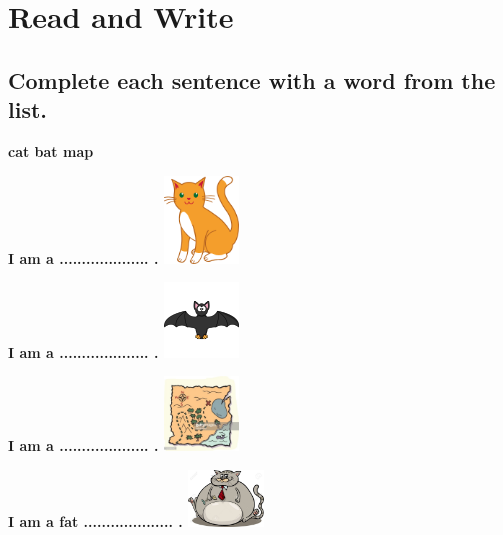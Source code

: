 \documentclass[a4paper, 12pt]{book}
\begin{document}
    \chapter{Read and Write}
    \section{Complete each sentence with a word from the list.}
    
    \begin{center}
        \textbf{\Huge{cat \hspace{0.8cm} bat \hspace{0.8cm} map}}
    \end{center}
    \vspace{8mm} %
    \begin{flushleft}
        \textbf{\Huge {I am a .................... . }}\includegraphics[width=0.15\textwidth]{cat.png}
    \end{flushleft}
    \begin{flushleft}
        \textbf{\Huge {I am a .................... . }}\includegraphics[width=0.15\textwidth]{bat.png}
    \end{flushleft}
    \begin{flushleft}
        \textbf{\Huge {I am a .................... . }}\includegraphics[width=0.15\textwidth]{map.jpeg}
    \end{flushleft}
    \begin{flushleft}
        \vspace{4mm}
        \textbf{\Huge {I am a fat .................... . }}\includegraphics[width=0.15\textwidth]{fat-cat.jpeg}
    \end{flushleft}
\end{document}
